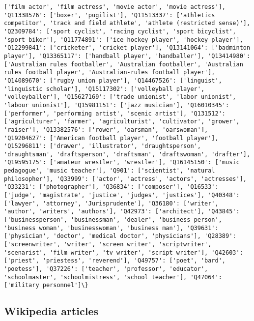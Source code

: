 \documentclass[11pt]{article}
\begin{document}
\begin{Verbatim}[commandchars=\\\{\}]
['film actor', 'film actress', 'movie actor', 'movie actress'], 'Q11338576': ['boxer', 'pugilist'], 'Q11513337': ['athletics competitor', 'track and field athlete', 'athlete (restricted sense)'], 'Q2309784': ['sport cyclist', 'racing cyclist', 'sport bicyclist', 'sport biker'], 'Q11774891': ['ice hockey player', 'hockey player'], 'Q12299841': ['cricketer', 'cricket player'], 'Q13141064': ['badminton player'], 'Q13365117': ['handball player', 'handballer'], 'Q13414980': ['Australian rules footballer', 'Australian footballer', 'Australian rules football player', 'Australian-rules football player'], 'Q14089670': ['rugby union player'], 'Q14467526': ['linguist', 'linguistic scholar'], 'Q15117302': ['volleyball player', 'volleyballer'], 'Q15627169': ['trade unionist', 'labor unionist', 'labour unionist'], 'Q15981151': ['jazz musician'], 'Q16010345': ['performer', 'performing artist', 'scenic artist'], 'Q131512': ['agriculturer', 'farmer', 'agriculturist', 'cultivator', 'grower', 'raiser'], 'Q13382576': ['rower', 'oarsman', 'oarswoman'], 'Q19204627': ['American football player', 'football player'], 'Q15296811': ['drawer', 'illustrator', 'draughtsperson', 'draughtsman', 'draftsperson', 'draftsman', 'draftswoman', 'drafter'], 'Q19595175': ['amateur wrestler', 'wrestler'], 'Q16145150': ['music pedagogue', 'music teacher'], 'Q901': ['scientist', 'natural philosopher'], 'Q33999': ['actor', 'actress', 'actors', 'actresses'], 'Q33231': ['photographer'], 'Q36834': ['composer'], 'Q16533': ['judge', 'magistrate', 'justice', 'judges', 'justices'], 'Q40348': ['lawyer', 'attorney', 'Jurisprudente'], 'Q36180': ['writer', 'author', 'writers', 'authors'], 'Q42973': ['architect'], 'Q43845': ['businessperson', 'businessman', 'dealer', 'business person', 'business woman', 'businesswoman', 'business man'], 'Q39631': ['physician', 'doctor', 'medical doctor', 'physicians'], 'Q28389': ['screenwriter', 'writer', 'screen writer', 'scriptwriter', 'scenarist', 'film writer', 'tv writer', 'script writer'], 'Q42603': ['priest', 'priestess', 'reverend'], 'Q49757': ['poet', 'bard', 'poetess'], 'Q37226': ['teacher', 'professor', 'educator', 'schoolmaster', 'schoolmistress', 'school teacher'], 'Q47064': ['military personnel']\}

    \end{Verbatim}

    \subsection{Wikipedia articles}\label{wikipedia-articles}
\end{document}
